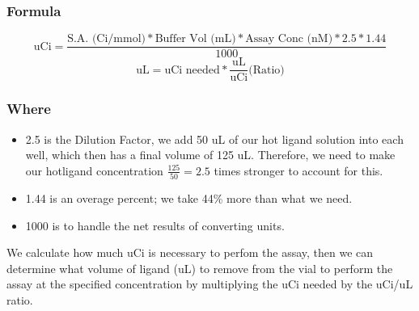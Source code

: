 \documentclass[12pt, letterpaper]{article}
\begin{document}
\subsubsection{Formula}
\[ \text{uCi} = \frac{\text{S.A. (Ci/mmol)} * \text{Buffer Vol (mL)} * \text{Assay Conc (nM)} * 2.5 * 1.44}{1000} \]
\[ \text{uL} = \text{uCi needed} * \frac{\text{uL}}{\text{uCi}} \text{(Ratio)} \]
\subsubsection{Where}
\begin{itemize}
    \item 2.5 is the Dilution Factor, we add 50 uL of our hot ligand solution into each well, which then has a final volume of 125 uL. Therefore, we need to make our hotligand concentration $\frac{125}{50} = 2.5$ times stronger to account for this.
    \item 1.44 is an overage percent; we take 44\% more than what we need.
    \item 1000 is to handle the net results of converting units.
\end{itemize}
We calculate how much uCi is necessary to perfom the assay, then we can determine what volume of ligand (uL) to remove from the vial to perform the assay at the specified concentration by multiplying the uCi needed by the uCi/uL ratio.
\end{document}
